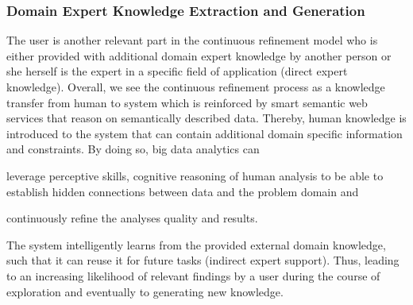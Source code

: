 \documentclass{sig-alternate-05-2015}
\begin{document}
\subsubsection{Domain Expert Knowledge Extraction and Generation}
The user is another relevant part in the continuous refinement model who is
either provided with additional domain expert knowledge by another person or
she herself is the expert in a specific field of application (direct expert
knowledge). Overall, we see the continuous refinement process as a knowledge
transfer from human to system which is reinforced by smart semantic web
services that reason on semantically described data. Thereby, human knowledge
is introduced to the system that can contain additional domain specific
information and constraints. By doing so, big data analytics can
\begin{inparaenum}[(1)]
 	\item leverage perceptive skills, cognitive reasoning of human analysis
to be able to establish hidden connections between data and the problem domain
and
	\item continuously refine the analyses quality and results.
\end{inparaenum}
The system intelligently learns from the provided external domain knowledge,
such that it can reuse it for future tasks (indirect expert support). Thus,
leading to an increasing likelihood of relevant findings by a user during the
course of exploration and eventually to generating new knowledge.
\end{document}
